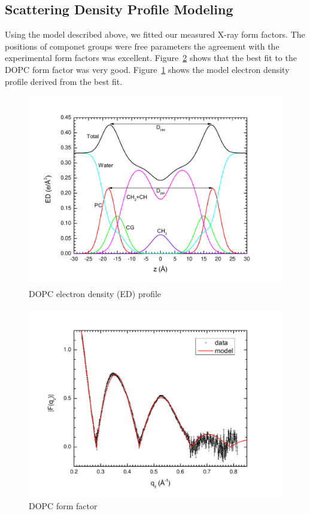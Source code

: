 \subsection{Scattering Density Profile Modeling}
Using the model described above, we fitted our measured X-ray form factors. 
The positions of componet groups were free
parameters the agreement with the experimental form factors was excellent. 
Figure~\ref{fig:DOPC_XFF1} shows that the best fit to the DOPC form factor
was very good. Figure~\ref{fig:DOPC_EDP1} shows the model electron density 
profile derived from the best fit.
\begin{figure}[htbp]
  \centering
  \includegraphics[scale=0.3]{./figures/Tat/SDP_Results/DOPC_EDP1.pdf}
  \caption{DOPC electron density (ED) profile}
  \label{fig:DOPC_EDP1}
\end{figure}
\begin{figure}[htbp]
  \centering
  \includegraphics[scale=0.3]{./figures/Tat/SDP_Results/DOPC_XFF1.pdf}
  \caption{DOPC form factor}
  \label{fig:DOPC_XFF1}
\end{figure}
